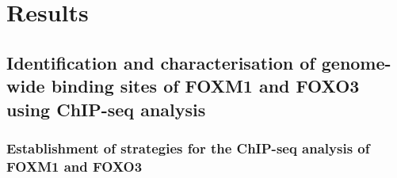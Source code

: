\chapter{Results} \label{ch:results}

{
\sloppy \raggedright
\section{Identification and characterisation of genome-wide binding sites of FOXM1 and FOXO3 using ChIP-seq analysis}
}

\subsection{Establishment of strategies for the ChIP-seq analysis of FOXM1 and FOXO3}

